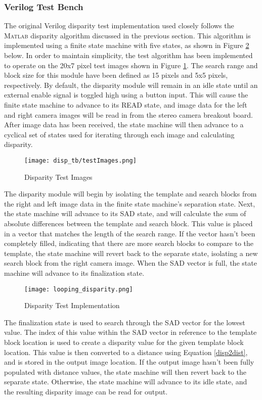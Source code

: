 \subsubsection{Verilog Test Bench}
The original Verilog disparity test implementation used closely follows the \textsc{Matlab} disparity algorithm discussed in the previous section. This algorithm is implemented using a finite state machine with five states, as shown in Figure \ref{disparityTestImp} below. In order to maintain simplicity, the test algorithm has been implemented to operate on the 20x7 pixel test images shown in Figure \ref{disparityTestImg}. The search range and block size for this module have been defined as 15 pixels and 5x5 pixels, respectively. By default, the disparity module will remain in an idle state until an external enable signal is toggled high using a button input. This will cause the finite state machine to advance to its READ state, and image data for the left and right camera images will be read in from the stereo camera breakout board. After image data has been received, the state machine will then advance to a cyclical set of states used for iterating through each image and calculating disparity. 
\par
\begin{figure}[H]
	\centerline{\texttt{[image: disp\_tb/testImages.png]}}
	\caption{Disparity Test Images}
	\label{disparityTestImg}
\end{figure}
The disparity module will begin by isolating the template and search blocks from the right and left image data in the finite state machine's separation state. Next, the state machine will advance to its SAD state, and will calculate the sum of absolute differences between the template and search block. This value is placed in a vector that matches the length of the search range. If the vector hasn't been completely filled, indicating that there are more search blocks to compare to the template, the state machine will revert back to the separate state, isolating a new search block from the right camera image. When the SAD vector is full, the state machine will advance to its finalization state. 
\par
\begin{figure}[H]
	\centerline{\texttt{[image: looping\_disparity.png]}}
	\caption{Disparity Test Implementation}
	\label{disparityTestImp}
\end{figure}
\par
The finalization state is used to search through the SAD vector for the lowest value. The index of this value within the SAD vector in reference to the template block location is used to create a disparity value for the given template block location. This value is then converted to a distance using Equation \ref{disp2dist}, and is stored in the output image location. If the output image hasn't been fully populated with distance values, the state machine will then revert back to the separate state. Otherwise, the state machine will advance to its idle state, and the resulting disparity image can be read for output. 
